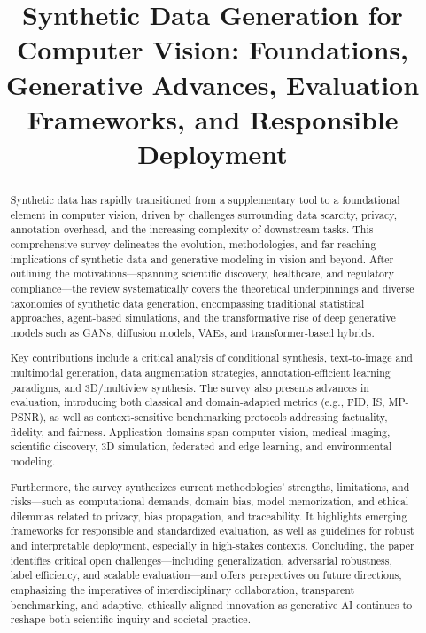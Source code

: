 \documentclass[sigconf]{acmart}
\title{Synthetic Data Generation for Computer Vision: Foundations, Generative Advances, Evaluation Frameworks, and Responsible Deployment}
\begin{document}
\begin{abstract}
Synthetic data has rapidly transitioned from a supplementary tool to a foundational element in computer vision, driven by challenges surrounding data scarcity, privacy, annotation overhead, and the increasing complexity of downstream tasks. This comprehensive survey delineates the evolution, methodologies, and far-reaching implications of synthetic data and generative modeling in vision and beyond. After outlining the motivations—spanning scientific discovery, healthcare, and regulatory compliance—the review systematically covers the theoretical underpinnings and diverse taxonomies of synthetic data generation, encompassing traditional statistical approaches, agent-based simulations, and the transformative rise of deep generative models such as GANs, diffusion models, VAEs, and transformer-based hybrids. 

Key contributions include a critical analysis of conditional synthesis, text-to-image and multimodal generation, data augmentation strategies, annotation-efficient learning paradigms, and 3D/multiview synthesis. The survey also presents advances in evaluation, introducing both classical and domain-adapted metrics (e.g., FID, IS, MP-PSNR), as well as context-sensitive benchmarking protocols addressing factuality, fidelity, and fairness. Application domains span computer vision, medical imaging, scientific discovery, 3D simulation, federated and edge learning, and environmental modeling.

Furthermore, the survey synthesizes current methodologies’ strengths, limitations, and risks—such as computational demands, domain bias, model memorization, and ethical dilemmas related to privacy, bias propagation, and traceability. It highlights emerging frameworks for responsible and standardized evaluation, as well as guidelines for robust and interpretable deployment, especially in high-stakes contexts. Concluding, the paper identifies critical open challenges—including generalization, adversarial robustness, label efficiency, and scalable evaluation—and offers perspectives on future directions, emphasizing the imperatives of interdisciplinary collaboration, transparent benchmarking, and adaptive, ethically aligned innovation as generative AI continues to reshape both scientific inquiry and societal practice.
\end{abstract}

\maketitle
\end{document}
